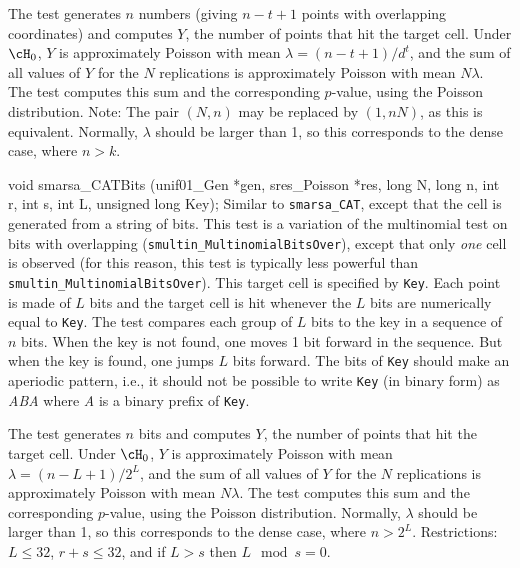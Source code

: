  The test generates $n$ numbers (giving $n-t+1$ points with overlapping 
 coordinates) and computes $Y$, the number of points that hit the target
  cell. Under $\cH_0$, $Y$ is approximately Poisson with mean
 $\lambda = (n-t+1)/d^t$,
 and the sum of all values of $Y$ for the
 $N$ replications is approximately Poisson with mean $N\lambda$.
 The test computes this sum and the corresponding $p$-value,
 using the Poisson distribution.
 Note: The pair $(N,n)$ may be replaced by $(1, nN)$, as this is equivalent.
 Normally, $\lambda$ should be larger than 1, 
 so this corresponds to the dense case, where $n > k$.
 \endtab
\code


void smarsa_CATBits (unif01_Gen *gen, sres_Poisson *res, long N, long n,
                     int r, int s, int L, unsigned long Key);
\endcode
\tab
  Similar to {\tt smarsa\_CAT}, except that the cell is generated
  from a string of bits.
 This test is a variation of the multinomial test on bits with overlapping
 ({\tt smultin\_MultinomialBitsOver}), except that only {\em one\/} cell is
 observed (for this reason, this test is typically less powerful than
 {\tt smultin\_MultinomialBitsOver}). 
 This target cell is specified by {\tt Key}.
 Each point is made of $L$ bits and the target cell is hit
 whenever the $L$ bits are numerically equal to {\tt Key}.
 The test compares each group of $L$ bits to the key in a sequence of
 $n$ bits. When the key is not found, one moves 1 bit forward
  in the sequence. But when the key is found, one jumps $L$ bits forward.
 The bits of {\tt Key}
 should make an aperiodic pattern, i.e., it should not
 be possible to write {\tt Key} (in binary form) as {\em ABA} where
 {\em A} is a binary prefix of  {\tt Key}.

 The test generates $n$ bits and computes $Y$, the number of points 
 that hit the target cell.
 Under $\cH_0$, $Y$ is approximately Poisson with mean
 $\lambda = (n-L+1)/2^L$, and the sum of all values of $Y$ for the
 $N$ replications is approximately Poisson with mean $N\lambda$.
 The test computes this sum and the corresponding $p$-value,
 using the Poisson distribution.
 Normally, $\lambda$ should be larger than 1, 
 so this corresponds to the dense case, where $n > 2^L$.
 Restrictions: $L \le 32$, $r+s \le 32$, and if $L > s$ then $L \mod s = 0$.
 \endtab
\code


